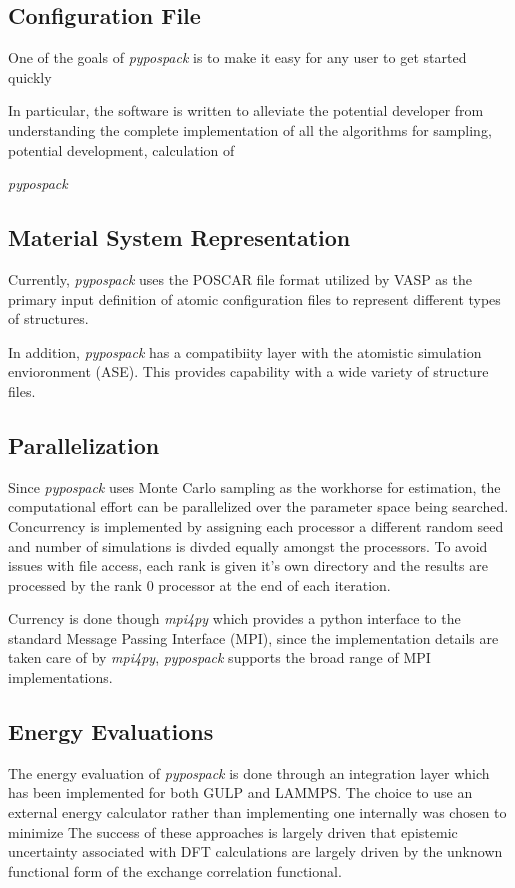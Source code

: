 \subsection{Configuration File}
One of the goals of \emph{pypospack} is to make it easy for any user to get started quickly

In particular, the software is written to alleviate the potential developer from understanding the complete implementation of all the algorithms for sampling, potential development, calculation of


\emph{pypospack}
\subsection{Material System Representation}

Currently, \emph{pypospack} uses the POSCAR file format utilized by VASP as the primary input definition of atomic configuration files to represent different types of structures.

In addition, \emph{pypospack} has a compatibiity layer with the atomistic simulation envioronment (ASE).  This provides capability with a wide variety of structure files.

\subsection{Parallelization}

Since \emph{pypospack} uses Monte Carlo sampling as the workhorse for estimation, the computational effort can be parallelized over the parameter space being searched.  Concurrency is implemented by assigning each processor a different random seed and number of simulations is divded equally amongst the processors.  To avoid issues with file access, each rank is given it's own directory and the results are processed by the rank $0$ processor at the end of each iteration.

Currency is done though \emph{mpi4py} which provides a python interface to the standard Message Passing Interface (MPI), since the implementation details are taken care of by \emph{mpi4py}, \emph{pypospack} supports the broad range of MPI implementations.

\subsection{Energy Evaluations}

The energy evaluation of \emph{pypospack} is done through an integration layer which has been implemented for both GULP and LAMMPS.  The choice to use an external energy calculator rather than implementing one internally was chosen to minimize
The success of these approaches is largely driven that epistemic uncertainty associated with DFT calculations are largely driven by the unknown functional form of the exchange correlation functional.

